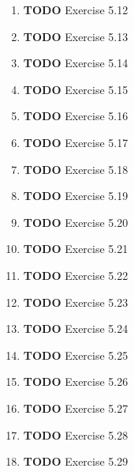 \documentclass[11pt]{article}
\begin{document}
\begin{enumerate}
\begin{enumerate}
\item {\bfseries\sffamily TODO} Exercise 5.12
\label{sec:orge995230}

\item {\bfseries\sffamily TODO} Exercise 5.13
\label{sec:org3517ed8}

\item {\bfseries\sffamily TODO} Exercise 5.14
\label{sec:orgee41003}

\item {\bfseries\sffamily TODO} Exercise 5.15
\label{sec:org41279bf}

\item {\bfseries\sffamily TODO} Exercise 5.16
\label{sec:org658e099}

\item {\bfseries\sffamily TODO} Exercise 5.17
\label{sec:org4789398}

\item {\bfseries\sffamily TODO} Exercise 5.18
\label{sec:orgeb20f38}

\item {\bfseries\sffamily TODO} Exercise 5.19
\label{sec:org077d2fb}

\item {\bfseries\sffamily TODO} Exercise 5.20
\label{sec:org332fbd7}

\item {\bfseries\sffamily TODO} Exercise 5.21
\label{sec:org79ee6df}

\item {\bfseries\sffamily TODO} Exercise 5.22
\label{sec:org56e5e9e}

\item {\bfseries\sffamily TODO} Exercise 5.23
\label{sec:org8535bb4}

\item {\bfseries\sffamily TODO} Exercise 5.24
\label{sec:orgce12be9}

\item {\bfseries\sffamily TODO} Exercise 5.25
\label{sec:org299cc2c}

\item {\bfseries\sffamily TODO} Exercise 5.26
\label{sec:org394fc2b}

\item {\bfseries\sffamily TODO} Exercise 5.27
\label{sec:org0ad27f7}

\item {\bfseries\sffamily TODO} Exercise 5.28
\label{sec:org315ec73}

\item {\bfseries\sffamily TODO} Exercise 5.29
\label{sec:org54ae5c8}


\end{enumerate}
\end{enumerate}
\end{document}
